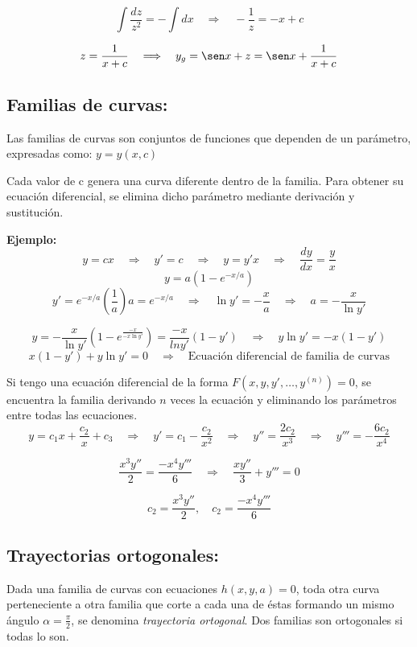 \documentclass[a4paper,12pt]{article}
\begin{document}
\[
\int \frac{dz}{z^2} = - \int dx 
\quad \Longrightarrow \quad 
-\frac{1}{z} = -x + c
\]

\[
z = \frac{1}{x + c}
\quad \Longrightarrow \quad 
y_g = \sen x + z = \sen x + \frac{1}{x + c}
\]

\subsection{Familias de curvas:}
\noindent
Las familias de curvas son conjuntos de funciones que dependen de un parámetro, expresadas como: \quad $y = y(x, c)$

\medskip
\noindent
Cada valor de c genera una curva diferente dentro de la familia.
Para obtener su ecuación diferencial, se elimina dicho parámetro mediante derivación y sustitución.

\medskip
\noindent
\textbf{Ejemplo:}
\[
y = c x \quad \Longrightarrow \quad y' = c \quad \Longrightarrow \quad y = y' x \quad \Longrightarrow \quad \frac{dy}{dx} = \frac{y}{x}
\]
\vspace{-0,8 em}
\[
y = a(1 - e^{-x/a})
\]
\vspace{-0,8 em}
\[
y' = e^{-x/a}\left( \frac{1}{a} \right)a = e^{-x/a} \quad \Longrightarrow \quad \ln y' = -\frac{x}{a} \quad \Longrightarrow \quad a = -\frac{x}{\ln y'}
\]

\[
y = -\frac{x}{\ln y'} \left(1 - e^{\frac{-x}{-x \ln y'}}\right) = \frac{-x}{ln y'}(1 - y') \quad \Longrightarrow \quad y \ln y' = - x(1 - y')
\]
\vspace{-0,2 em}
\[
x(1 - y') + y \ln y' = 0 \quad \Longrightarrow \quad \text{Ecuación diferencial de familia de curvas}
\]

\medskip
\noindent
Si tengo una ecuación diferencial de la forma $F(x, y, y', \ldots, y^{(n)}) = 0$, se encuentra la familia derivando $n$ veces la ecuación y eliminando los parámetros entre todas las ecuaciones.
\vspace{0,4 em}
\[
y = c_1 x + \frac{c_2}{x} + c_3 
\quad \Longrightarrow \quad y' = c_1 - \frac{c_2}{x^2}
\quad \Longrightarrow \quad y'' = \frac{2c_2}{x^3}
\quad \Longrightarrow \quad y''' = -\frac{6c_2}{x^4}
\]

\[
\frac{x^3 y''}{2} = \frac{-x^4 y'''}{6}
\quad \Longrightarrow \quad \frac{x y''}{3} + y''' = 0
\]

\[
c_2 = \frac{x^3 y''}{2}, \quad c_2 = \frac{-x^4 y'''}{6}
\]

\newpage
\subsection{Trayectorias ortogonales:}
\noindent
Dada una familia de curvas con ecuaciones $h(x, y, a) = 0$, toda otra curva perteneciente a otra familia que corte a cada una de éstas formando un mismo ángulo $\alpha = \frac{\pi}{2}$, se denomina \textit{trayectoria ortogonal}.  
Dos familias son ortogonales si todas lo son.
\end{document}
